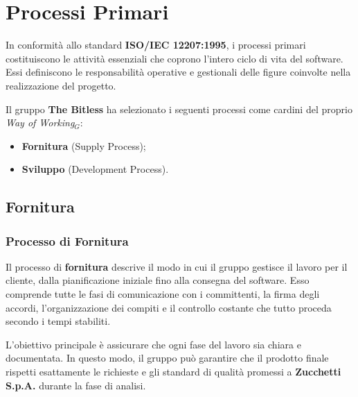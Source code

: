 \documentclass[a4paper, 10pt]{article}
\begin{document}
\section{Processi Primari}
In conformità allo standard \textbf{ISO/IEC 12207:1995}, i processi primari costituiscono le attività essenziali che coprono l'intero ciclo di vita del software. Essi definiscono le responsabilità operative e gestionali delle figure coinvolte nella realizzazione del progetto.

Il gruppo \textbf{The Bitless} ha selezionato i seguenti processi come cardini del proprio \textit{Way of Working$_G$}:
\begin{itemize}
    \item \textbf{Fornitura} (Supply Process);
    \item \textbf{Sviluppo} (Development Process).
\end{itemize}

\subsection{Fornitura}
\subsubsection{Processo di Fornitura}
Il processo di \textbf{fornitura} descrive il modo in cui il gruppo gestisce il lavoro per il cliente, dalla pianificazione iniziale fino alla consegna del software. Esso comprende tutte le fasi di comunicazione con i committenti, la firma degli accordi, l'organizzazione dei compiti e il controllo costante che tutto proceda secondo i tempi stabiliti.

L'obiettivo principale è assicurare che ogni fase del lavoro sia chiara e documentata. In questo modo, il gruppo può garantire che il prodotto finale rispetti esattamente le richieste e gli standard di qualità promessi a \textbf{Zucchetti S.p.A.} durante la fase di analisi.
\end{document}
